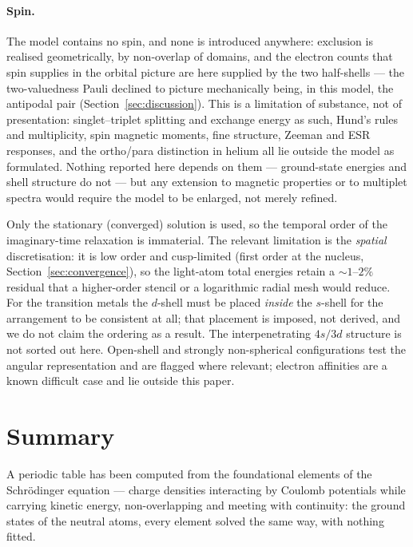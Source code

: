 \documentclass[11pt]{article}
\begin{document}
\paragraph{Spin.} The model contains no spin, and none is introduced anywhere: exclusion is
realised geometrically, by non-overlap of domains, and the electron counts that spin supplies in
the orbital picture are here supplied by the two half-shells --- the two-valuedness Pauli declined
to picture mechanically being, in this model, the antipodal pair
(Section~\ref{sec:discussion}). This is a
limitation of substance, not of presentation: singlet--triplet splitting and exchange
energy as such, Hund's rules and multiplicity, spin magnetic moments, fine structure,
Zeeman and ESR responses, and the ortho/para distinction in helium all lie outside the
model as formulated. Nothing reported here depends on them --- ground-state energies and
shell structure do not --- but any extension to magnetic properties or to multiplet
spectra would require the model to be enlarged, not merely refined.


Only the stationary (converged) solution is used, so the temporal order of the
imaginary-time relaxation is immaterial. The relevant limitation is the \emph{spatial}
discretisation: it is low order and cusp-limited (first order at the nucleus,
Section~\ref{sec:convergence}), so the light-atom total energies retain a ${\sim}1$--$2\%$
residual that a higher-order stencil or a logarithmic radial mesh would reduce. For the
transition metals the $d$-shell must be placed
\emph{inside} the $s$-shell for the arrangement to be consistent at all; that placement is
imposed, not derived, and we do not claim the ordering as a result. The interpenetrating
$4s/3d$ structure is not sorted out here. Open-shell and strongly non-spherical
configurations test the angular representation and are flagged where relevant; electron
affinities are a known difficult case and lie outside this paper.

\section{Summary}\label{sec:conclusion}

A periodic table has been computed from the foundational elements of the Schr\"odinger equation ---
charge densities interacting by Coulomb potentials while carrying kinetic energy, non-overlapping and
meeting with continuity: the ground states of the neutral atoms,
every element solved the same way, with nothing fitted.
\end{document}
